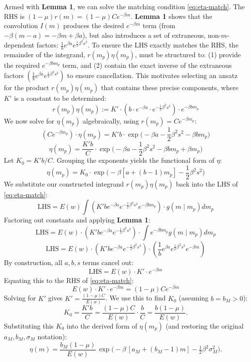 \documentclass[extra,mreferee]{gji}
\theoremstyle{lemma}
\begin{document}
Armed with \textbf{Lemma 1}, we can solve the matching condition \eqref{eq:eta-match}. The RHS is $(1-\mu)r(m) = (1-\mu)C e^{-\beta m}$. \textbf{Lemma 1} shows that the convolution $I(m)$ produces the desired $e^{-\beta m}$ term (from $-\beta(m-a) = -\beta m + \beta a$), but also introduces a set of extraneous, non-$m$-dependent factors: $\frac{1}{b} e^{\beta a} e^{\frac{1}{2}\beta^2 s^2}$. To ensure the LHS exactly matches the RHS, the remainder of the integrand, $r(m_p)\eta(m_p)$, must be structured to: (1) provide the required $e^{-\beta b m_p}$ term, and (2) contain the exact inverse of the extraneous factors $\left(\frac{1}{b} e^{\beta a} e^{\frac{1}{2}\beta^2 s^2}\right)$ to ensure cancellation.
This motivates selecting an ansatz for the product $r(m_p)\eta(m_p)$ that contains these precise components, where $K'$ is a constant to be determined:
\[
r(m_p)\eta(m_p) := K' \cdot \left( b \cdot e^{-\beta a} \cdot e^{-\frac{1}{2}\beta^2 s^2} \right) \cdot e^{-\beta b m_p}
\]
We now solve for $\eta(m_p)$ algebraically, using $r(m_p) = C e^{-\beta m_p}$:
\[
(C e^{-\beta m_p}) \cdot \eta(m_p) = K' b \cdot \exp\!\Big(-\beta a - \frac{1}{2}\beta^2 s^2 - \beta b m_p \Big)
\]
\[
\eta(m_p) = \frac{K' b}{C} \cdot \exp\!\Big(-\beta a - \frac{1}{2}\beta^2 s^2 - \beta b m_p + \beta m_p \Big)
\]
Let $K_0 = K' b / C$. Grouping the exponents yields the functional form of $\eta$:
\[
\eta(m_p) = K_0 \cdot \exp\!\Big( -\beta[a + (b - 1)m_p] - \frac{1}{2}\beta^2 s^2 \Big)
\]
We substitute our constructed integrand $r(m_p)\eta(m_p)$ back into the LHS of \eqref{eq:eta-match}:
\[
\mathrm{LHS} = E(w) \int \left( K' b e^{-\beta a} e^{-\frac{1}{2}\beta^2 s^2} e^{-\beta b m_p} \right) \cdot g(m\mid m_p) dm_p
\]
Factoring out constants and applying \textbf{Lemma 1}:
\[
\mathrm{LHS} = E(w) \cdot \left( K' b e^{-\beta a} e^{-\frac{1}{2}\beta^2 s^2} \right) \cdot \int e^{-\beta b m_p} g(m\mid m_p) dm_p
\]
\[
\mathrm{LHS} = E(w) \cdot \left( K' b e^{-\beta a} e^{-\frac{1}{2}\beta^2 s^2} \right) \cdot \left( \frac{1}{b} e^{\beta a} e^{\frac{1}{2}\beta^2 s^2} e^{-\beta m} \right)
\]
By construction, all $a, b, s$ terms cancel out:
\[
\mathrm{LHS} = E(w) \cdot K' \cdot e^{-\beta m}
\]
Equating this to the RHS of \eqref{eq:eta-match}:
\[
E(w) \cdot K' \cdot e^{-\beta m} = (1-\mu) C e^{-\beta m}
\]
Solving for $K'$ gives $K' = \frac{(1-\mu)C}{E(w)}$. We use this to find $K_0$ (assuming $b=b_M > 0$):
\[
K_0 = \frac{K' b}{C} = \frac{(1-\mu)C}{E(w)} \cdot \frac{b}{C} = \frac{b(1-\mu)}{E(w)}.
\]
Substituting this \(K_0\) into the derived form of \(\eta(m_p)\) (and restoring the original \(a_M, b_M, \sigma_M\) notation):
\begin{equation}\label{eq:eta-final}
\boxed{\quad
\eta(m)=\frac{b_M(1-\mu)}{E(w)}\,
\exp\!\Big(-\beta\,[a_M+(b_M-1)m]-\tfrac{1}{2}\beta^2\sigma_M^2\Big).\quad}
\end{equation}
\end{document}
